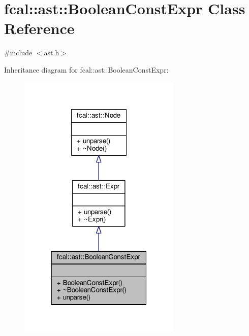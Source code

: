 \hypertarget{classfcal_1_1ast_1_1BooleanConstExpr}{}\section{fcal\+:\+:ast\+:\+:Boolean\+Const\+Expr Class Reference}
\label{classfcal_1_1ast_1_1BooleanConstExpr}


{\ttfamily \#include $<$ast.\+h$>$}



Inheritance diagram for fcal\+:\+:ast\+:\+:Boolean\+Const\+Expr\+:
\nopagebreak
\begin{figure}[H]
\begin{center}
\leavevmode
\includegraphics[width=220pt]{classfcal_1_1ast_1_1BooleanConstExpr__inherit__graph}
\end{center}
\end{figure}


